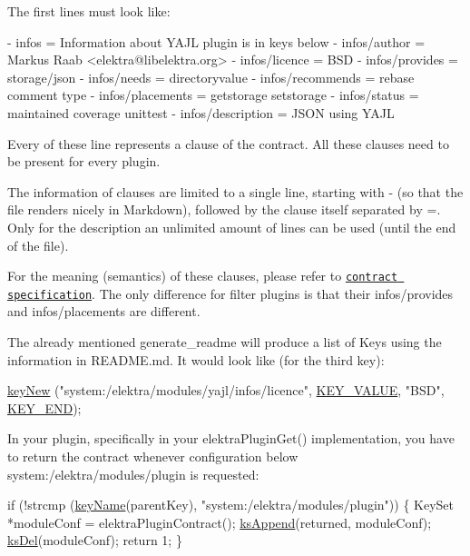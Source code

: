 The first lines must look like\+:


\begin{DoxyCode}
- infos = Information about YAJL plugin is in keys below
- infos/author = Markus Raab <elektra@libelektra.org>
- infos/licence = BSD
- infos/provides = storage/json
- infos/needs = directoryvalue
- infos/recommends = rebase comment type
- infos/placements = getstorage setstorage
- infos/status = maintained coverage unittest
- infos/description = JSON using YAJL
\end{DoxyCode}


Every of these line represents a clause of the contract. All these clauses need to be present for every plugin.

The information of clauses are limited to a single line, starting with {\ttfamily -\/} (so that the file renders nicely in Markdown), followed by the clause itself separated by {\ttfamily =}. Only for the description an unlimited amount of lines can be used (until the end of the file).

For the meaning (semantics) of these clauses, please refer to \href{/home/jenkins/workspace/libelektra-release/doc/CONTRACT.ini}{\tt contract specification}. The only difference for filter plugins is that their {\ttfamily infos/provides} and {\ttfamily infos/placements} are different.

The already mentioned {\ttfamily generate\+\_\+readme} will produce a list of Keys using the information in {\ttfamily R\+E\+A\+D\+M\+E.\+md}. It would look like (for the third key)\+:


\begin{DoxyCode}
\hyperlink{group__key_gad23c65b44bf48d773759e1f9a4d43b89}{keyNew} (\textcolor{stringliteral}{"system:/elektra/modules/yajl/infos/licence"},
        \hyperlink{group__key_gga9b703ca49f48b482def322b77d3e6bc8ac66e4a49d09212b79f5754ca6db5bd2e}{KEY\_VALUE}, \textcolor{stringliteral}{"BSD"}, \hyperlink{group__key_gga9b703ca49f48b482def322b77d3e6bc8aa8adb6fcb92dec58fb19410eacfdd403}{KEY\_END});
\end{DoxyCode}


In your plugin, specifically in your {\ttfamily elektra\+Plugin\+Get()} implementation, you have to return the contract whenever configuration below {\ttfamily system\+:/elektra/modules/plugin} is requested\+:


\begin{DoxyCode}
\textcolor{keywordflow}{if} (!strcmp (\hyperlink{group__keyname_ga8e805c726a60da921d3736cda7813513}{keyName}(parentKey), \textcolor{stringliteral}{"system:/elektra/modules/plugin"}))
\{
        KeySet *moduleConf = elektraPluginContract();
        \hyperlink{group__keyset_ga21eb9c3a14a604ee3a8bdc779232e7b7}{ksAppend}(returned, moduleConf);
        \hyperlink{group__keyset_ga27e5c16473b02a422238c8d970db7ac8}{ksDel}(moduleConf);
        \textcolor{keywordflow}{return} 1;
\}
\end{DoxyCode}


